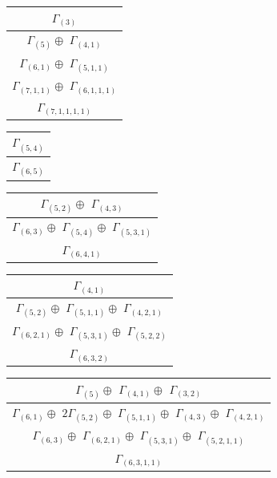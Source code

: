 \documentclass[main.tex]{subfiles}
\begin{document}
\begin{minipage}{.2\textwidth}
\centering
\begin{tabular}{c}
$\Gamma_{(
3
)}$
\\ \hline
$\Gamma_{(
5
)} \oplus$
$\Gamma_{(
4 , 
1
)}$
\\ \hline
$\Gamma_{(
6 , 
1
)} \oplus$
$\Gamma_{(
5 , 
1 , 
1
)}$
\\ \hline
$\Gamma_{(
7 , 
1 , 
1
)} \oplus$
$\Gamma_{(
6 , 
1 , 
1 , 
1
)}$
\\ \hline
$\Gamma_{(
7 , 
1 , 
1 , 
1 , 
1
)}$
\\
\end{tabular}\end{minipage}
\begin{minipage}{.2\textwidth}
\centering
\begin{tabular}{c}
$\Gamma_{(
5 , 
4
)}$
\\ \hline
$\Gamma_{(
6 , 
5
)}$
\\
\end{tabular}\end{minipage}
\bigskip
\begin{minipage}{.3\textwidth}
\centering
\begin{tabular}{c}
$\Gamma_{(
5 , 
2
)} \oplus$
$\Gamma_{(
4 , 
3
)}$
\\ \hline
$\Gamma_{(
6 , 
3
)} \oplus$
$\Gamma_{(
5 , 
4
)} \oplus$
$\Gamma_{(
5 , 
3 , 
1
)}$
\\ \hline
$\Gamma_{(
6 , 
4 , 
1
)}$
\\
\end{tabular}\end{minipage}
\begin{minipage}{.3\textwidth}
\centering
\begin{tabular}{c}
$\Gamma_{(
4 , 
1
)}$
\\ \hline
$\Gamma_{(
5 , 
2
)} \oplus$
$\Gamma_{(
5 , 
1 , 
1
)} \oplus$
$\Gamma_{(
4 , 
2 , 
1
)}$
\\ \hline
$\Gamma_{(
6 , 
2 , 
1
)} \oplus$
$\Gamma_{(
5 , 
3 , 
1
)} \oplus$
$\Gamma_{(
5 , 
2 , 
2
)}$
\\ \hline
$\Gamma_{(
6 , 
3 , 
2
)}$
\\
\end{tabular}\end{minipage}
\begin{minipage}{.4\textwidth}
\centering
\begin{tabular}{c}
$\Gamma_{(
5
)} \oplus$
$\Gamma_{(
4 , 
1
)} \oplus$
$\Gamma_{(
3 , 
2
)}$
\\ \hline
$\Gamma_{(
6 , 
1
)} \oplus$
$2\Gamma_{(
5 , 
2
)} \oplus$
$\Gamma_{(
5 , 
1 , 
1
)} \oplus$
$\Gamma_{(
4 , 
3
)} \oplus$
$\Gamma_{(
4 , 
2 , 
1
)}$
\\ \hline
$\Gamma_{(
6 , 
3
)} \oplus$
$\Gamma_{(
6 , 
2 , 
1
)} \oplus$
$\Gamma_{(
5 , 
3 , 
1
)} \oplus$
$\Gamma_{(
5 , 
2 , 
1 , 
1
)}$
\\ \hline
$\Gamma_{(
6 , 
3 , 
1 , 
1
)}$
\\
\end{tabular}\end{minipage}
\end{document}
